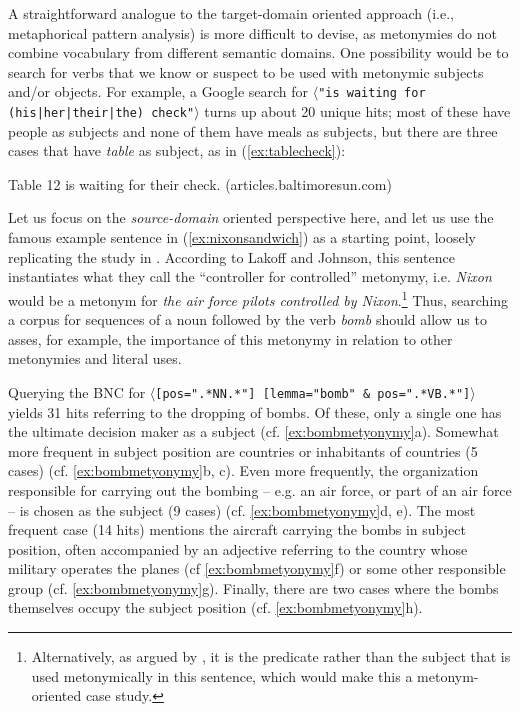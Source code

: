 A straightforward analogue to the target\hyp{}domain oriented approach (i.e., metaphorical  pattern analysis)  is more difficult to devise, as metonymies  do not combine vocabulary from different semantic  domains. One possibility would be to search for verbs  that we know or suspect to be used with metonymic subjects and\slash or objects. For example, a Google search for $\langle$\texttt{"is waiting for (his|her|\linebreak their|the) check"}$\rangle$ turns up about 20 unique hits; most of these have people as subjects and none of them have meals as subjects, but there are three cases that have \textit{table} as subject, as in (\ref{ex:tablecheck}):

\begin{exe}
\ex Table 12 is waiting for their check. (articles.baltimoresun.com)
\label{ex:tablecheck}
\end{exe}

Let us focus on the \textit{source\hyp{}domain} oriented perspective here, and let us use the famous example sentence in (\ref{ex:nixonsandwich}) as a starting point, loosely replicating  the study in \citet{stefanowitsch_metonymies_2015}. According to Lakoff and Johnson, this sentence instantiates what they call the ``controller for controlled'' metonymy,  i.e. \textit{Nixon} would be a metonym for \textit{the air force pilots controlled by Nixon}.\footnote{Alternatively, as argued by \citet{stallard_two_1993}, it is the predicate rather than the subject that is used metonymically  in this sentence, which would make this a metonym\hyp{}oriented case study.} Thus, searching a corpus for sequences of a noun  followed by the verb  \textit{bomb} should allow us to asses, for example, the importance of this metonymy  in relation to other metonymies and literal  uses.

Querying the BNC  for $\langle$\texttt{[pos=".*NN.*"] [lemma="bomb" \& pos=".*VB.*"]}$\rangle$ yields 31 hits referring to the dropping of bombs. Of these, only a single one has the ultimate decision maker as a subject (cf. \ref{ex:bombmetyonymy}a). Somewhat more frequent in subject position are countries or inhabitants of countries (5 cases) (cf. \ref{ex:bombmetyonymy}b, c). Even more frequently, the organization responsible for carrying out the bombing -- e.g. an air force, or part of an air force -- is chosen as the subject (9 cases) (cf. \ref{ex:bombmetyonymy}d, e). The most frequent case (14 hits) mentions the aircraft carrying the bombs in subject position, often accompanied by an adjective  referring to the country whose military operates the planes (cf \ref{ex:bombmetyonymy}f) or some other responsible group (cf. \ref{ex:bombmetyonymy}g). Finally, there are two cases where the bombs themselves occupy the subject position (cf. \ref{ex:bombmetyonymy}h).

